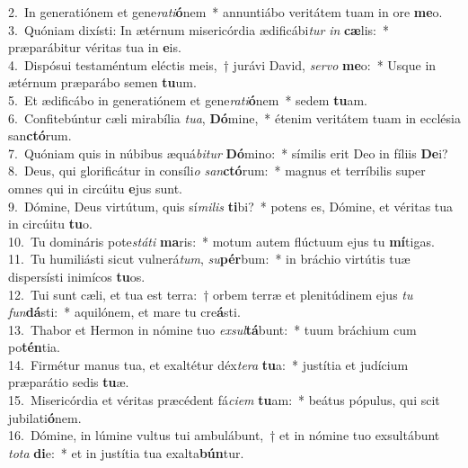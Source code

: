 {2.~}In generatiónem et gene\textit{ra}\textit{ti}\textbf{ó}nem~* annuntiábo veritátem tuam in ore \textbf{me}o.\\
{3.~}Quóniam dixísti: In ætérnum misericórdia ædificábi\textit{tur} \textit{in} \textbf{cæ}lis:~* præparábitur véritas tua in \textbf{e}is.\\
{4.~}Dispósui testaméntum eléctis meis,~† jurávi David, \textit{ser}\textit{vo} \textbf{me}o:~* Usque in ætérnum præparábo semen \textbf{tu}um.\\
{5.~}Et ædificábo in generatiónem et gene\textit{ra}\textit{ti}\textbf{ó}nem~* sedem \textbf{tu}am.\\
{6.~}Confitebúntur cæli mirabília \textit{tu}\textit{a}, \textbf{Dó}mine,~* étenim veritátem tuam in ecclésia san\textbf{ctó}rum.\\
{7.~}Quóniam quis in núbibus æquá\textit{bi}\textit{tur} \textbf{Dó}mino:~* símilis erit Deo in fíliis \textbf{De}i?\\
{8.~}Deus, qui glorificátur in consíli\textit{o} \textit{san}\textbf{ctó}rum:~* magnus et terríbilis super omnes qui in circúitu \textbf{e}jus sunt.\\
{9.~}Dómine, Deus virtútum, quis sí\textit{mi}\textit{lis} \textbf{ti}bi?~* potens es, Dómine, et véritas tua in circúitu \textbf{tu}o.\\
{10.~}Tu domináris pote\textit{stá}\textit{ti} \textbf{ma}ris:~* motum autem flúctuum ejus tu \textbf{mí}tigas.\\
{11.~}Tu humiliásti sicut vulnerá\textit{tum}, \textit{su}\textbf{pér}bum:~* in bráchio virtútis tuæ dispersísti inimícos \textbf{tu}os.\\
{12.~}Tui sunt cæli, et tua est terra:~† orbem terræ et plenitúdinem ejus \textit{tu} \textit{fun}\textbf{dá}sti:~* aquilónem, et mare tu cre\textbf{á}sti.\\
{13.~}Thabor et Hermon in nómine tuo \textit{ex}\textit{sul}\textbf{tá}bunt:~* tuum bráchium cum po\textbf{tén}tia.\\
{14.~}Firmétur manus tua, et exaltétur déx\textit{te}\textit{ra} \textbf{tu}a:~* justítia et judícium præparátio sedis \textbf{tu}æ.\\
{15.~}Misericórdia et véritas præcédent fá\textit{ci}\textit{em} \textbf{tu}am:~* beátus pópulus, qui scit jubilati\textbf{ó}nem.\\
{16.~}Dómine, in lúmine vultus tui ambulábunt,~† et in nómine tuo exsultábunt \textit{to}\textit{ta} \textbf{di}e:~* et in justítia tua exalta\textbf{bún}tur.\\
